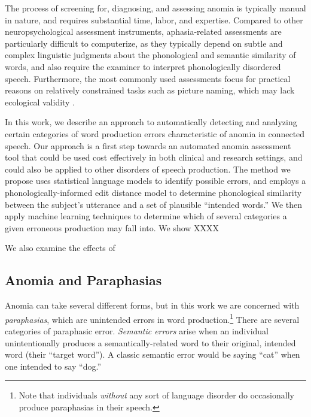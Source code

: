 \documentclass[11pt,letterpaper]{article}
\begin{document}
The process of screening for, diagnosing, and assessing anomia is typically manual in nature, and requires substantial time, labor, and expertise. 
Compared to other neuropsychological assessment instruments, aphasia-related assessments are particularly difficult to computerize, as they typically depend on subtle and complex linguistic judgments about the phonological and semantic similarity of words, and also require the examiner to interpret phonologically disordered speech.
Furthermore, the most commonly used assessments focus for practical reasons on relatively constrained tasks such as picture naming, which may lack ecological validity \cite{Mayer:2003kp}.

In this work, we describe an approach to automatically detecting and analyzing certain categories of word production errors characteristic of anomia in connected speech.
Our approach is a first step towards an automated anomia assessment tool that could be used cost effectively in both clinical and research settings, and could also be applied to other disorders of speech production.
The method we propose uses statistical language models to identify possible errors, and employs a phonologically-informed edit distance model to determine phonological similarity between the subject's utterance and a set of plausible ``intended words.''
We then apply machine learning techniques to determine which of several categories a given erroneous production may fall into. 
We show XXXX %

We also examine the effects of 

\subsection{Anomia and Paraphasias} %
\label{sub:anomia_and_paraphasias}


Anomia can take several different forms, but in this work we are concerned with \emph{paraphasias}, which are unintended errors in word production.\footnote{Note that individuals \emph{without} any sort of language disorder do occasionally produce paraphasias in their speech.} 
There are several categories of paraphasic error. \emph{Semantic errors} arise when an individual unintentionally produces a semantically-related word to their original, intended word (their ``target word'').
A classic semantic error would be saying ``cat'' when one intended to say ``dog.''
\end{document}
